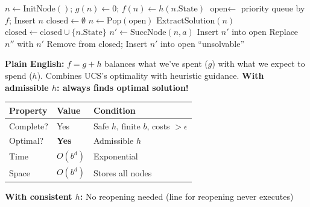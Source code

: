 \documentclass[11pt,a4paper]{article}
\begin{document}
\begin{examplebox}[A* Pseudocode]
\begin{algorithmic}
\STATE $n \gets \text{InitNode}()$; $g(n) \gets 0$; $f(n) \gets h(n.\text{State})$ 
\STATE $\text{open} \gets$ priority queue by $f$; Insert $n$ 
\STATE $\text{closed} \gets \emptyset$
    \STATE $n \gets \text{Pop}(\text{open})$ 
     
        \RETURN $\text{ExtractSolution}(n)$
    \ENDIF
    \STATE $\text{closed} \gets \text{closed} \cup \{n.\text{State}\}$
        \STATE $n' \gets \text{SuccNode}(n, a)$ 
            \STATE Insert $n'$ into open 
            \STATE Replace $n''$ with $n'$ 
            \STATE Remove from closed; Insert $n'$ into open 
        \ENDIF
    \ENDFOR
\ENDWHILE
\RETURN ``unsolvable''
\end{algorithmic}
\textbf{Plain English:} $f = g + h$ balances what we've spent ($g$) with what we expect to spend ($h$). Combines UCS's optimality with heuristic guidance. \textbf{With admissible $h$: always finds optimal solution!}
\end{examplebox}

\begin{definitionbox}[A* Properties]
\begin{center}
\begin{tabular}{@{}lll@{}}
\toprule
\textbf{Property} & \textbf{Value} & \textbf{Condition} \\
\midrule
Complete? & Yes & Safe $h$, finite $b$, costs $> \epsilon$ \\
Optimal? & \textbf{Yes} & Admissible $h$ \\
Time & $O(b^d)$ & Exponential \\
Space & $O(b^d)$ & Stores all nodes \\
\bottomrule
\end{tabular}
\end{center}

\textbf{With consistent $h$:} No reopening needed (line for reopening never executes)
\end{definitionbox}
\end{document}
